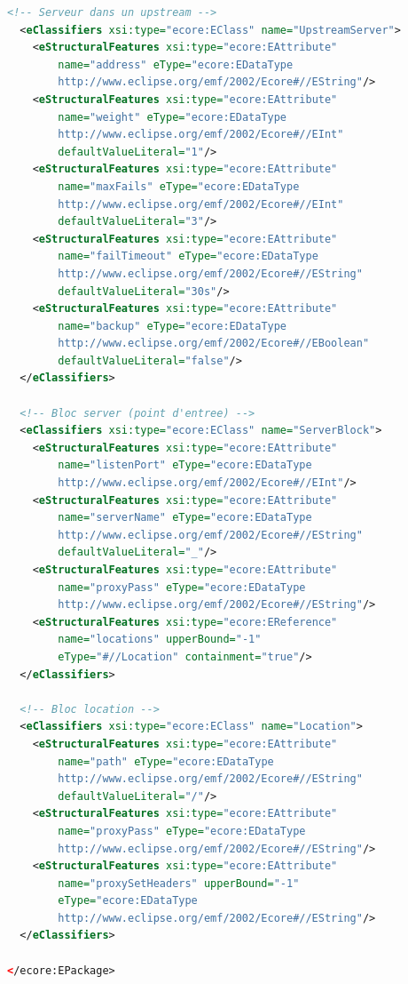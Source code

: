 \documentclass[12pt,a4paper]{report}
\begin{document}
\begin{lstlisting}[language=XML, caption={Métamodèle PSM Nginx (nginx.ecore)}]
  <!-- Serveur dans un upstream -->
  <eClassifiers xsi:type="ecore:EClass" name="UpstreamServer">
    <eStructuralFeatures xsi:type="ecore:EAttribute"
        name="address" eType="ecore:EDataType
        http://www.eclipse.org/emf/2002/Ecore#//EString"/>
    <eStructuralFeatures xsi:type="ecore:EAttribute"
        name="weight" eType="ecore:EDataType
        http://www.eclipse.org/emf/2002/Ecore#//EInt"
        defaultValueLiteral="1"/>
    <eStructuralFeatures xsi:type="ecore:EAttribute"
        name="maxFails" eType="ecore:EDataType
        http://www.eclipse.org/emf/2002/Ecore#//EInt"
        defaultValueLiteral="3"/>
    <eStructuralFeatures xsi:type="ecore:EAttribute"
        name="failTimeout" eType="ecore:EDataType
        http://www.eclipse.org/emf/2002/Ecore#//EString"
        defaultValueLiteral="30s"/>
    <eStructuralFeatures xsi:type="ecore:EAttribute"
        name="backup" eType="ecore:EDataType
        http://www.eclipse.org/emf/2002/Ecore#//EBoolean"
        defaultValueLiteral="false"/>
  </eClassifiers>

  <!-- Bloc server (point d'entree) -->
  <eClassifiers xsi:type="ecore:EClass" name="ServerBlock">
    <eStructuralFeatures xsi:type="ecore:EAttribute"
        name="listenPort" eType="ecore:EDataType
        http://www.eclipse.org/emf/2002/Ecore#//EInt"/>
    <eStructuralFeatures xsi:type="ecore:EAttribute"
        name="serverName" eType="ecore:EDataType
        http://www.eclipse.org/emf/2002/Ecore#//EString"
        defaultValueLiteral="_"/>
    <eStructuralFeatures xsi:type="ecore:EAttribute"
        name="proxyPass" eType="ecore:EDataType
        http://www.eclipse.org/emf/2002/Ecore#//EString"/>
    <eStructuralFeatures xsi:type="ecore:EReference"
        name="locations" upperBound="-1"
        eType="#//Location" containment="true"/>
  </eClassifiers>

  <!-- Bloc location -->
  <eClassifiers xsi:type="ecore:EClass" name="Location">
    <eStructuralFeatures xsi:type="ecore:EAttribute"
        name="path" eType="ecore:EDataType
        http://www.eclipse.org/emf/2002/Ecore#//EString"
        defaultValueLiteral="/"/>
    <eStructuralFeatures xsi:type="ecore:EAttribute"
        name="proxyPass" eType="ecore:EDataType
        http://www.eclipse.org/emf/2002/Ecore#//EString"/>
    <eStructuralFeatures xsi:type="ecore:EAttribute"
        name="proxySetHeaders" upperBound="-1"
        eType="ecore:EDataType
        http://www.eclipse.org/emf/2002/Ecore#//EString"/>
  </eClassifiers>

</ecore:EPackage>
\end{lstlisting}
\end{document}
